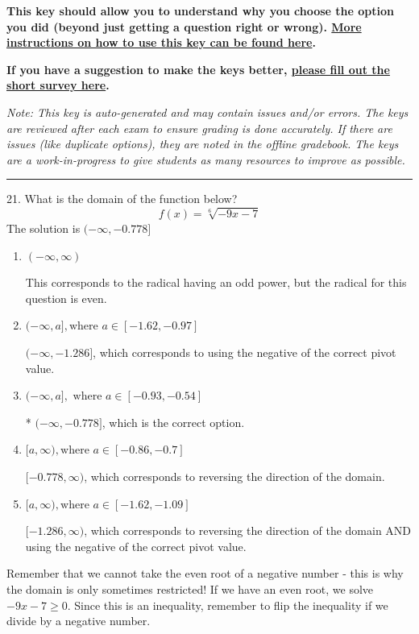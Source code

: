 \documentclass{extbook}[14pt]
\begin{document}
\textbf{This key should allow you to understand why you choose the option you did (beyond just getting a question right or wrong). \href{https://xronos.clas.ufl.edu/mac1105spring2020/courseDescriptionAndMisc/Exams/LearningFromResults}{More instructions on how to use this key can be found here}.}

\textbf{If you have a suggestion to make the keys better, \href{https://forms.gle/CZkbZmPbC9XALEE88}{please fill out the short survey here}.}

\textit{Note: This key is auto-generated and may contain issues and/or errors. The keys are reviewed after each exam to ensure grading is done accurately. If there are issues (like duplicate options), they are noted in the offline gradebook. The keys are a work-in-progress to give students as many resources to improve as possible.}

\rule{\textwidth}{0.4pt}

21. What is the domain of the function below?
\[ f(x) = \sqrt[6]{-9 x - 7} \] 
The solution is $ (-\infty, -0.778] $ 

\begin{enumerate}[label=\Alph*.] 
\item $ (-\infty, \infty) $ 

 This corresponds to the radical having an odd power, but the radical for this question is even. 
\item $ (-\infty, a], \text{where } a \in [-1.62, -0.97] $ 

 $(-\infty, -1.286]$, which corresponds to using the negative of the correct pivot value. 
\item $ (-\infty, a], \text{ where } a \in [-0.93, -0.54] $ 

 * $(-\infty, -0.778]$, which is the correct option. 
\item $ [a, \infty), \text{where } a \in [-0.86, -0.7] $ 

  $[-0.778, \infty)$, which corresponds to reversing the direction of the domain. 
\item $ [a, \infty), \text{where } a \in [-1.62, -1.09] $ 

 $[-1.286, \infty)$, which corresponds to reversing the direction of the domain AND using the negative of the correct pivot value. 
\end{enumerate} 
 
Remember that we cannot take the even root of a negative number - this is why the domain is only sometimes restricted! If we have an even root, we solve $-9 x - 7 \geq 0$. Since this is an inequality, remember to flip the inequality if we divide by a negative number.
\end{document}

